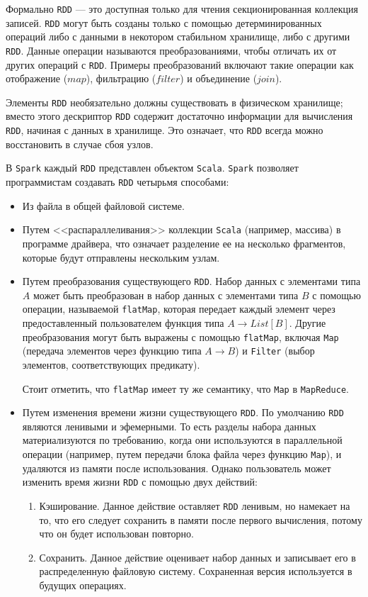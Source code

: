 Формально \texttt{RDD} --- это доступная только для чтения секционированная коллекция записей. 
\texttt{RDD} могут быть созданы только с помощью детерминированных операций либо с данными в некотором стабильном хранилище, либо с другими \texttt{RDD}. 
Данные операции называются преобразованиями, чтобы отличать их от других операций с \texttt{RDD}. 
Примеры преобразований включают такие операции как отображение ($map$), фильтрацию ($filter$) и объединение ($join$).

Элементы \texttt{RDD} необязательно должны существовать в физическом хранилище; 
вместо этого дескриптор \texttt{RDD} содержит достаточно информации для вычисления \texttt{RDD}, начиная с данных в хранилище. 
Это означает, что \texttt{RDD} всегда можно восстановить в случае сбоя узлов. 

В \texttt{Spark} каждый \texttt{RDD} представлен объектом \texttt{Scala}.
\texttt{Spark} позволяет программистам создавать \texttt{RDD} четырьмя способами:

\begin{itemize}
  \item Из файла в общей файловой системе.
  \item Путем <<распараллеливания>> коллекции \texttt{Scala} (например, массива) в программе драйвера, что означает разделение ее на несколько фрагментов, которые будут отправлены нескольким узлам.
  \item Путем преобразования существующего \texttt{RDD}. 
    Набор данных с элементами типа $A$ может быть преобразован в набор данных с элементами типа $B$ с помощью операции, называемой \texttt{flatMap}, которая передает каждый элемент через предоставленный пользователем функция типа $A \rightarrow List[B]$. 
    Другие преобразования могут быть выражены с помощью \texttt{flatMap}, включая \texttt{Map} (передача элементов через функцию типа $A \rightarrow B$) и \texttt{Filter} (выбор элементов, соответствующих предикату).
    
    Стоит отметить, что \texttt{flatMap} имеет ту же семантику, что \texttt{Map} в \texttt{MapReduce}.
  \item Путем изменения времени жизни существующего \texttt{RDD}.
    По умолчанию \texttt{RDD} являются ленивыми и эфемерными. 
    То есть разделы набора данных материализуются по требованию, когда они используются в параллельной операции (например, путем передачи блока файла через функцию \texttt{Map}), и удаляются из памяти после использования. 
    Однако пользователь может изменить время жизни \texttt{RDD} с помощью двух действий:
    \begin{enumerate}
      \item Кэширование. 
        Данное действие оставляет \texttt{RDD} ленивым, но намекает на то, что его следует сохранить в памяти после первого вычисления, потому что он будет использован повторно.
      \item Сохранить. 
        Данное действие оценивает набор данных и записывает его в распределенную файловую систему. 
        Сохраненная версия используется в будущих операциях.
    \end{enumerate}
\end{itemize}

